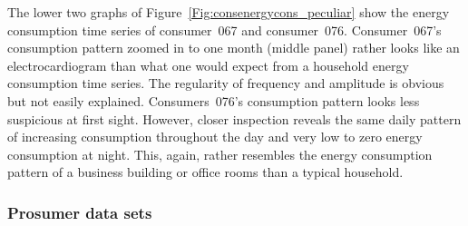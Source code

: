 The lower two graphs of Figure~\ref{Fig:consenergycons_peculiar} show the energy consumption time series of consumer~067 and consumer~076. Consumer~067's consumption pattern zoomed in to one month (middle panel) rather looks like an electrocardiogram than what one would expect from a household energy consumption time series. The regularity of frequency and amplitude is obvious but not easily explained. Consumers~076's consumption pattern looks less suspicious at first sight. However, closer inspection reveals the same daily pattern of increasing consumption throughout the day and very low to zero energy consumption at night. This, again, rather resembles the energy consumption pattern of a business building or office rooms than a typical household.



\newpage
\subsubsection{Prosumer data sets}

